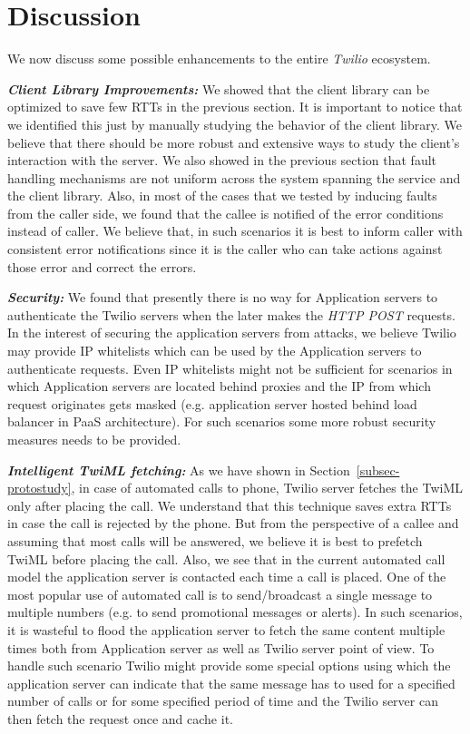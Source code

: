 \section{Discussion}
\label{sec-discussion}
We now discuss some possible enhancements to the entire \textit{Twilio} ecosystem. 

\emph{\textbf{Client Library Improvements:}}
We showed that the client library can be optimized to save few RTTs in the previous section. It is important to notice that we identified this just by manually studying the behavior of the client library. We believe that there should be more robust and extensive ways to study the client's interaction with the server. We also showed in the previous section that fault handling mechanisms are not uniform across the system spanning the service and the client library. Also, in most of the cases that we tested by inducing faults from the caller side, we found that the callee is notified of the error conditions instead of caller. We believe that, in such scenarios it is best to inform caller with consistent error notifications since it is the caller who can take actions against those error and correct the errors.


\emph{\textbf{Security:}} We found that presently there is no way for Application servers to authenticate the Twilio servers when the later makes the \textit{HTTP POST} requests. In the interest of securing the application servers from attacks, we believe Twilio may provide IP whitelists which can be used by the Application servers to authenticate requests. Even IP whitelists might not be sufficient for scenarios in which Application servers are located behind proxies and the IP from which request originates gets masked (e.g. application server hosted behind load balancer in PaaS architecture). For such scenarios some more robust security measures needs to be provided.

\emph{\textbf{Intelligent TwiML fetching:}} As we have shown in Section~\ref{subsec-protostudy}, in case of automated calls to phone, Twilio server fetches the TwiML only after placing the call. We understand that this technique saves extra RTTs in case the call is rejected by the phone. But from the perspective of a callee and assuming that most calls will be answered, we believe it is best to prefetch TwiML before placing the call. Also, we see that in the current automated call model the application server is contacted each time a call is placed. One of the most popular use of automated call is to send/broadcast a single message to multiple numbers (e.g. to send promotional messages or alerts). In such scenarios, it is wasteful to flood the application server to fetch the same content multiple times both from Application server as well as Twilio server point of view. To handle such scenario Twilio might provide some special options using which the application server can indicate that the same message has to used for a specified number of calls or for some specified period of time and the Twilio server can then fetch the request once and cache it.   
 